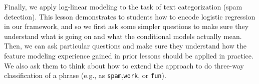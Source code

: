 \documentclass[11pt,letterpaper]{article}
\begin{document}
Finally, we apply log-linear modeling to the task of text categorization (spam detection). This lesson demonstrates to students how to encode logistic regression in our framework, and so 
we first ask some simpler questions to make sure they understand what is going on and what the conditional models actually mean.
Then, we can ask particular questions and make sure they understand how the feature modeling experience gained in 
prior lessons should be applied in practice. We also ask them to think about how to extend the approach to do three-way classification 
of a phrase (e.g., as \texttt{spam},\texttt{work}, or \texttt{fun}).


\end{document}
